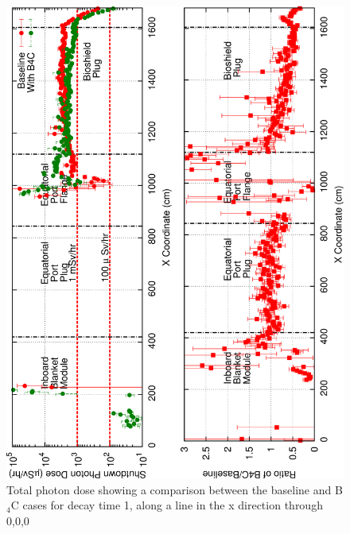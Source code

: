 \documentclass[12pt]{article}
\begin{document}
\begin{figure}[ht!]
\centering
\includegraphics[angle=-90,clip,scale=0.15]{../plots/photon_lineout/dc1_z0_lineout.png}
\caption{Total photon dose showing a comparison between the baseline and B$_4$C cases for decay time 1,
         along a line in the x direction through 0,0,0}
\label{fig:photons_dc1_total_dose_lineout}
\end{figure}
\end{document}
